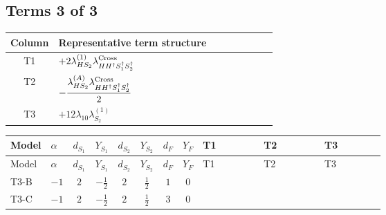 \documentclass[8pt]{article}
\begin{document}
\begin{landscape}
\subsection*{Terms 3 of 3}
\begin{center}
\begin{tabular}{@{}c >{\raggedright\arraybackslash}p{0.82\linewidth}@{}}
\toprule
Column & Representative term structure \\
\midrule
T1 & \(\displaystyle +2 {\lambda_{HS_2}^{(1)}} {\lambda_{H H^\dagger S_1^\dagger S_2^\dagger}^{\rm Cross}}\) \\
\midrule
T2 & \(\displaystyle -\frac{{\lambda_{HS_2}^{(A)}} {\lambda_{H H^\dagger S_1^\dagger S_2^\dagger}^{\rm Cross}}}{2}\) \\
\midrule
T3 & \(\displaystyle +12 {\lambda_{10}} {\lambda_{S_2}^{(1)}}\) \\
\midrule
\bottomrule
\end{tabular}
\end{center}
\smallskip
\tiny
\begin{longtable}{@{}llcccccc >{\raggedright\arraybackslash}p{0.21\linewidth} >{\raggedright\arraybackslash}p{0.21\linewidth} >{\raggedright\arraybackslash}p{0.21\linewidth}@{}}
\toprule
Model & $\alpha$ & $d_{S_1}$ & $Y_{S_1}$ & $d_{S_2}$ & $Y_{S_2}$ & $d_F$ & $Y_F$ & T1 & T2 & T3 \\
\midrule
\endfirsthead
\toprule
Model & $\alpha$ & $d_{S_1}$ & $Y_{S_1}$ & $d_{S_2}$ & $Y_{S_2}$ & $d_F$ & $Y_F$ & T1 & T2 & T3 \\
\midrule
\endhead
T3-B & $-1$ & $2$ & $-\frac{1}{2}$ & $2$ & $\frac{1}{2}$ & $1$ & $0$ & \scriptsize\adjustbox{max width=\linewidth}{$\begin{gathered} +2 {\lambda_{HS_2}^{(1)}} {\lambda_{H H^\dagger S_1^\dagger S_2^\dagger}^{\rm Cross}}\end{gathered}$} & \scriptsize\adjustbox{max width=\linewidth}{$\begin{gathered} -\frac{{\lambda_{HS_2}^{(A)}} {\lambda_{H H^\dagger S_1^\dagger S_2^\dagger}^{\rm Cross}}}{2}\end{gathered}$} & \scriptsize\adjustbox{max width=\linewidth}{$\begin{gathered} +12 {\lambda_{10}} {\lambda_{S_2}^{(1)}}\end{gathered}$} \\
\midrule
T3-C & $-1$ & $2$ & $-\frac{1}{2}$ & $2$ & $\frac{1}{2}$ & $3$ & $0$ & \scriptsize\adjustbox{max width=\linewidth}{$\begin{gathered} +2 {\lambda_{HS_2}^{(1)}} {\lambda_{H H^\dagger S_1^\dagger S_2^\dagger}^{\rm Cross}}\end{gathered}$} & \scriptsize\adjustbox{max width=\linewidth}{$\begin{gathered} -\frac{{\lambda_{HS_2}^{(A)}} {\lambda_{H H^\dagger S_1^\dagger S_2^\dagger}^{\rm Cross}}}{2}\end{gathered}$} & \scriptsize\adjustbox{max width=\linewidth}{$\begin{gathered} +12 {\lambda_{10}} {\lambda_{S_2}^{(1)}}\end{gathered}$} \\

\end{longtable}
\end{landscape}
\end{document}
